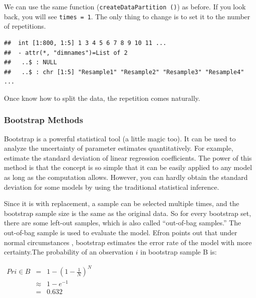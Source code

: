 \documentclass[12pt,]{krantz}
\newenvironment{Shaded}{\begin{snugshade}}{\end{snugshade}}
\newcommand{\KeywordTok}[1]{\textcolor[rgb]{0.13,0.29,0.53}{\textbf{{#1}}}}
\newcommand{\DataTypeTok}[1]{\textcolor[rgb]{0.13,0.29,0.53}{{#1}}}
\newcommand{\DecValTok}[1]{\textcolor[rgb]{0.00,0.00,0.81}{{#1}}}
\newcommand{\StringTok}[1]{\textcolor[rgb]{0.31,0.60,0.02}{{#1}}}
\newcommand{\OtherTok}[1]{\textcolor[rgb]{0.56,0.35,0.01}{{#1}}}
\newcommand{\NormalTok}[1]{{#1}}
\theoremstyle{definition}
\theoremstyle{definition}
\theoremstyle{remark}
\begin{document}
We can use the same function (\texttt{createDataPartition\ ()}) as
before. If you look back, you will see \texttt{times\ =\ 1}. The only
thing to change is to set it to the number of repetitions.

\begin{Shaded}
\end{Shaded}

\begin{verbatim}
##  int [1:800, 1:5] 1 3 4 5 6 7 8 9 10 11 ...
##  - attr(*, "dimnames")=List of 2
##   ..$ : NULL
##   ..$ : chr [1:5] "Resample1" "Resample2" "Resample3" "Resample4" ...
\end{verbatim}

Once know how to split the data, the repetition comes naturally.

\subsubsection{Bootstrap Methods}\label{bootstrap-methods}

Bootstrap is a powerful statistical tool (a little magic too). It can be
used to analyze the uncertainty of parameter estimates
\citep{bootstrap1986} quantitatively. For example, estimate the standard
deviation of linear regression coefficients. The power of this method is
that the concept is so simple that it can be easily applied to any model
as long as the computation allows. However, you can hardly obtain the
standard deviation for some models by using the traditional statistical
inference.

Since it is with replacement, a sample can be selected multiple times,
and the bootstrap sample size is the same as the original data. So for
every bootstrap set, there are some left-out samples, which is also
called ``out-of-bag samples.'' The out-of-bag sample is used to evaluate
the model. Efron points out that under normal circumstances
\citep{efron1983}, bootstrap estimates the error rate of the model with
more certainty.The probability of an observation \(i\) in bootstrap
sample B is:

\(\begin{array}{ccc} Pr{i\in B} & = & 1-\left(1-\frac{1}{N}\right)^{N}\\  & \approx & 1-e^{-1}\\  & = & 0.632 \end{array}\)
\end{document}
